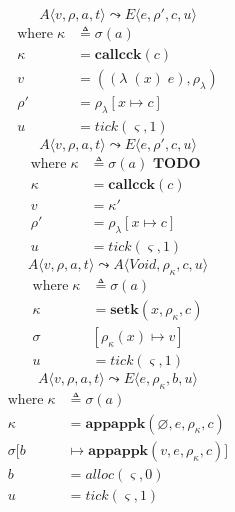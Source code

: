 \documentclass[12pt,draft]{article}
\newcommand{\singlelamsyn}[2]{(\lambda\;(#1)\;#2)}
\begin{document}
\begin{multicols*}{2}
\[
A\langle
v , \rho , a , t
\rangle
\leadsto
E\langle
e , \rho' , c , u
\rangle
\]
\vspace{-13mm}
\begin{align*}
\text{where}\; \kappa &\triangleq \sigma(a) \\
\kappa &= \textbf{callcck}(c) \\
v &= (\singlelamsyn{x}{e} , \rho_{\lambda}) \\
\rho' &= \rho_{\lambda}[x \mapsto c] \\
u &= tick(\varsigma, 1)
\end{align*}
\[
A\langle
v , \rho , a , t
\rangle
\leadsto
E\langle
e , \rho' , c , u
\rangle
\]
\vspace{-10mm}
\begin{align*}
\text{where}\; \kappa &\triangleq \sigma(a) \textbf{ TODO }\\
\kappa &= \textbf{callcck}(c) \\
v &= \kappa' \\
\rho' &= \rho_{\lambda}[x \mapsto c] \\
u &= tick(\varsigma, 1)
\end{align*}
\[
A\langle
v , \rho , a , t
\rangle
\leadsto
A\langle
\textit{Void} , \rho_{\kappa} , c , u
\rangle
\]
\vspace{-10mm}
\begin{align*}
\text{where}\; \kappa &\triangleq \sigma(a)\\
\kappa &= \textbf{setk}(x, \rho_{\kappa}, c) \\
\sigma&[\rho_{\kappa}(x) \mapsto v] \\
u &= tick(\varsigma, 1)
\end{align*}
\[
A\langle
v , \rho , a , t
\rangle
\leadsto
E\langle
e , \rho_{\kappa} , b , u
\rangle
\]
\vspace{-10mm}
\begin{align*}
\text{where}\; \kappa &\triangleq \sigma(a)\\
\kappa &= \textbf{appappk}(\varnothing, e, \rho_{\kappa}, c) \\
\sigma[b &\mapsto \textbf{appappk}(v, e, \rho_{\kappa}, c)] \\
b &= alloc(\varsigma, 0) \\
u &= tick(\varsigma, 1)
\end{align*}
\end{multicols*}
\newpage
\end{document}

